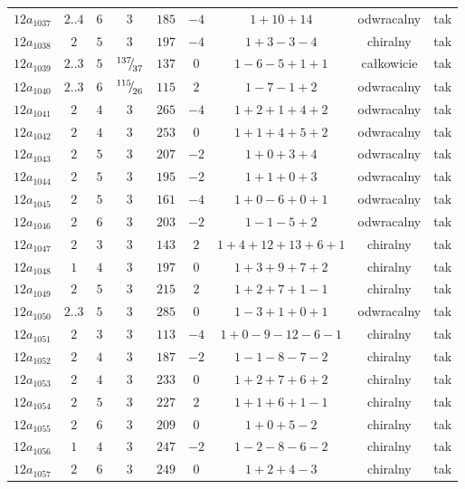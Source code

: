 \begin{longtable}{ccccccccc}
$12a_{1037}$ & $2..4$ & $6$ & $3$ & $185$ & $-4$ & $1+10+14$ & odwracalny & tak \\
$12a_{1038}$ & $2$ & $5$ & $3$ & $197$ & $-4$ & $1+3-3-4$ & chiralny & tak \\
$12a_{1039}$ & $2..3$ & $5$ & ${}^{137}{\mskip -5mu/\mskip -3mu}_{37}$ & $137$ & $0$ & $1-6-5+1+1$ & całkowicie & tak \\
$12a_{1040}$ & $2..3$ & $6$ & ${}^{115}{\mskip -5mu/\mskip -3mu}_{26}$ & $115$ & $2$ & $1-7-1+2$ & odwracalny & tak \\
$12a_{1041}$ & $2$ & $4$ & $3$ & $265$ & $-4$ & $1+2+1+4+2$ & odwracalny & tak \\
$12a_{1042}$ & $2$ & $4$ & $3$ & $253$ & $0$ & $1+1+4+5+2$ & odwracalny & tak \\
$12a_{1043}$ & $2$ & $5$ & $3$ & $207$ & $-2$ & $1+0+3+4$ & odwracalny & tak \\
$12a_{1044}$ & $2$ & $5$ & $3$ & $195$ & $-2$ & $1+1+0+3$ & odwracalny & tak \\
$12a_{1045}$ & $2$ & $5$ & $3$ & $161$ & $-4$ & $1+0-6+0+1$ & odwracalny & tak \\
$12a_{1046}$ & $2$ & $6$ & $3$ & $203$ & $-2$ & $1-1-5+2$ & odwracalny & tak \\
$12a_{1047}$ & $2$ & $3$ & $3$ & $143$ & $2$ & $1+4+12+13+6+1$ & chiralny & tak \\
$12a_{1048}$ & $1$ & $4$ & $3$ & $197$ & $0$ & $1+3+9+7+2$ & chiralny & tak \\
$12a_{1049}$ & $2$ & $5$ & $3$ & $215$ & $2$ & $1+2+7+1-1$ & chiralny & tak \\
$12a_{1050}$ & $2..3$ & $5$ & $3$ & $285$ & $0$ & $1-3+1+0+1$ & odwracalny & tak \\
$12a_{1051}$ & $2$ & $3$ & $3$ & $113$ & $-4$ & $1+0-9-12-6-1$ & chiralny & tak \\
$12a_{1052}$ & $2$ & $4$ & $3$ & $187$ & $-2$ & $1-1-8-7-2$ & chiralny & tak \\
$12a_{1053}$ & $2$ & $4$ & $3$ & $233$ & $0$ & $1+2+7+6+2$ & chiralny & tak \\
$12a_{1054}$ & $2$ & $5$ & $3$ & $227$ & $2$ & $1+1+6+1-1$ & chiralny & tak \\
$12a_{1055}$ & $2$ & $6$ & $3$ & $209$ & $0$ & $1+0+5-2$ & chiralny & tak \\
$12a_{1056}$ & $1$ & $4$ & $3$ & $247$ & $-2$ & $1-2-8-6-2$ & chiralny & tak \\
$12a_{1057}$ & $2$ & $6$ & $3$ & $249$ & $0$ & $1+2+4-3$ & chiralny & tak \\

\end{longtable}
